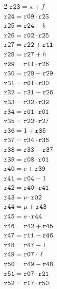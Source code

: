\documentclass[10pt]{article}
\begin{document}
\begin{multicols}{2}
\(\mathtt{r23} = \kappa + f\)\\
\(\mathtt{r24} = \mathtt{r09} \cdot \mathtt{r23}\)\\
\(\mathtt{r25} = \mathtt{r24} - b\)\\
\(\mathtt{r26} = \mathtt{r02} \cdot \mathtt{r25}\)\\
\(\mathtt{r27} = \mathtt{r22} + \mathtt{r11}\)\\
\(\mathtt{r28} = \mathtt{r27} + h\)\\
\(\mathtt{r29} = \mathtt{r11} \cdot \mathtt{r26}\)\\
\(\mathtt{r30} = \mathtt{r28} - \mathtt{r29}\)\\
\(\mathtt{r31} = \mathtt{r01} \cdot \mathtt{r30}\)\\
\(\mathtt{r32} = \mathtt{r31} - \mathtt{r26}\)\\
\(\mathtt{r33} = \mathtt{r32} \cdot \mathtt{r32}\)\\
\(\mathtt{r34} = \mathtt{r01} \cdot \mathtt{r01}\)\\
\(\mathtt{r35} = \mathtt{r22} \cdot \mathtt{r27}\)\\
\(\mathtt{r36} = 1 + \mathtt{r35}\)\\
\(\mathtt{r37} = \mathtt{r34} \cdot \mathtt{r36}\)\\
\(\mathtt{r38} = \mathtt{r33} - \mathtt{r37}\)\\
\(\mathtt{r39} = \mathtt{r08} \cdot \mathtt{r01}\)\\
\(\mathtt{r40} = c + \mathtt{r39}\)\\
\(\mathtt{r41} = \mathtt{r04} - 1\)\\
\(\mathtt{r42} = \mathtt{r40} \cdot \mathtt{r41}\)\\
\(\mathtt{r43} = \nu \cdot \mathtt{r02}\)\\
\(\mathtt{r44} = \mu + \mathtt{r43}\)\\
\(\mathtt{r45} = a \cdot \mathtt{r44}\)\\
\columnbreak
\(\mathtt{r46} = \mathtt{r42} + \mathtt{r45}\)\\
\(\mathtt{r47} = \mathtt{r11} - \mathtt{r46}\)\\
\(\mathtt{r48} = \mathtt{r47} - 1\)\\
\(\mathtt{r49} = \mathtt{r07} \cdot \ell\)\\
\(\mathtt{r50} = \mathtt{r49} - \mathtt{r48}\)\\
\(\mathtt{r51} = \mathtt{r07} \cdot \mathtt{r21}\)\\
\(\mathtt{r52} = \mathtt{r17} \cdot \mathtt{r50}\)\\

\end{multicols}
\end{document}
